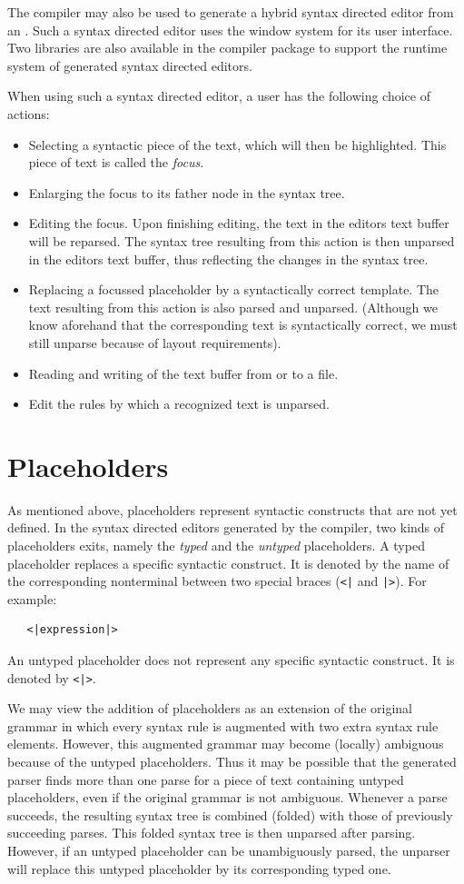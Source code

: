 The \EAG compiler may also be used to generate a hybrid syntax directed
editor from an \EAGns. Such a syntax directed editor uses
the \Xelf window system for its user interface. Two libraries
are also available in the \EAG compiler package to support
the runtime system of generated syntax directed editors.

When using such a syntax directed editor, a user has the
following choice of actions:
\begin {itemize}
\item
Selecting a syntactic piece of the text, which will
then be highlighted. This piece of text is called the {\em focus}.
\item
Enlarging the focus to its father node in the syntax tree.
\item
Editing the focus. Upon finishing editing, the text in the
editors text buffer will be reparsed. The syntax tree
resulting from this action is then unparsed in the editors
text buffer, thus reflecting the changes in the syntax tree.
\item
Replacing a focussed placeholder by a syntactically
correct template. The text resulting from this action is
also parsed and unparsed. (Although we know aforehand that
the corresponding text is syntactically correct, we must
still unparse because of layout requirements). 
\item
Reading and writing of the text buffer from or to a file.
\item
Edit the rules by which a recognized text is unparsed.
\end {itemize}
\section {Placeholders}
As mentioned above, placeholders represent syntactic
constructs that are not yet defined. In the syntax
directed editors generated by the \EAG compiler, two kinds
of placeholders exits, namely the {\em typed} and the
{\em untyped} placeholders. A typed placeholder replaces a specific
syntactic construct. It is denoted by the name of the corresponding
nonterminal between two special braces (\verb+<|+ and \verb+|>+).
For example:
\begin{verbatim}
   <|expression|>
\end{verbatim}
An untyped placeholder does not represent any specific syntactic
construct. It is denoted by \verb+<|>+.

We may view the addition of placeholders as an extension of
the original grammar in which every syntax rule is augmented
with two extra syntax rule elements. However, this augmented
grammar may become (locally) ambiguous because of the untyped
placeholders. Thus it may be possible that the generated parser
finds more than one parse for a piece of text containing untyped
placeholders, even if the original grammar is not ambiguous.
Whenever a parse succeeds, the resulting syntax tree is combined (folded)
with those of previously succeeding parses. This folded syntax
tree is then unparsed after parsing. However, if an untyped
placeholder can be unambiguously parsed, the unparser will replace
this untyped placeholder by its corresponding typed one.
